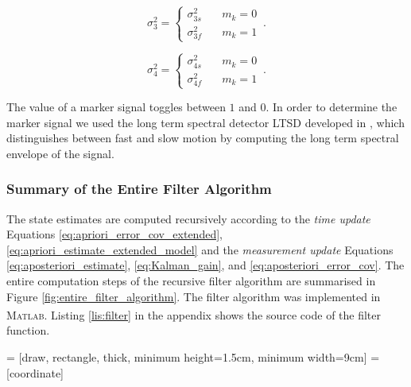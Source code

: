 \begin{equation}
  \sigma^2_3 = \begin{cases}
  	\sigma^2_{3s} & \quad m_k = 0 \\
  	\sigma^2_{3f} & \quad m_k = 1
  \end{cases}\,.
\end{equation}

\begin{equation}
  \sigma^2_4 = \begin{cases}
  	\sigma^2_{4s} & \quad m_k = 0 \\
  	\sigma^2_{4f} & \quad m_k = 1
  \end{cases}\,.
\end{equation}

\noindent
The value of a marker signal toggles between $1$ and $0$. In order to determine the marker signal we used the long term spectral detector \gls{LTSD} developed in \cite{olivares_vicente_gaitwatch_2013}, which distinguishes between fast and slow motion by computing the long term spectral envelope of the signal.

\subsubsection{Summary of the Entire Filter Algorithm}

The state estimates are computed recursively according to the \emph{time update} Equations \ref{eq:apriori_error_cov_extended}, \ref{eq:apriori_estimate_extended_model} and the \emph{measurement update} Equations \ref{eq:aposteriori_estimate}, \ref{eq:Kalman_gain}, and \ref{eq:aposteriori_error_cov}. The entire computation steps of the recursive filter algorithm are summarised in Figure \ref{fig:entire_filter_algorithm}. The filter algorithm was implemented in \textsc{Matlab}\textsuperscript{\textregistered}. Listing \ref{lis:filter} in the appendix shows the source code of the filter function.

 = [draw, rectangle, thick, 
    minimum height=1.5cm, minimum width=9cm]
 = [coordinate]

